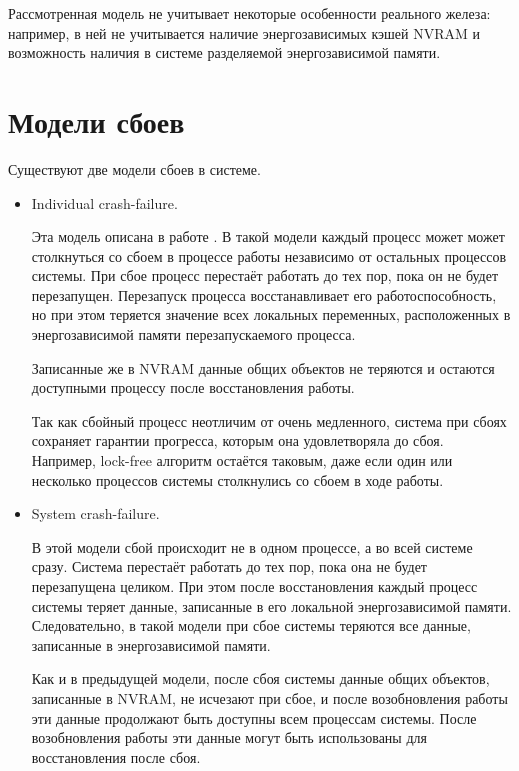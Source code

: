 \documentclass[times,specification,annotation]{itmo-student-thesis}
\begin{document}
\bigbreak

Рассмотренная модель не учитывает некоторые особенности реального железа: например, в ней не учитывается наличие энергозависимых кэшей NVRAM и возможность наличия в системе разделяемой энергозависимой памяти.

\section{Модели сбоев}
\label{crush-models}

Существуют две модели сбоев в системе.

\begin{itemize}
    \item Individual crash-failure.
    
    Эта модель описана в работе \cite{attiya2018nesting}. В такой модели каждый процесс может может столкнуться со сбоем в процессе работы независимо от остальных процессов системы. При сбое процесс перестаёт работать до тех пор, пока он не будет перезапущен. Перезапуск процесса восстанавливает его работоспособность, но при этом теряется значение всех локальных переменных, расположенных в энергозависимой памяти перезапускаемого процесса.
    
    Записанные же в NVRAM данные общих объектов не теряются и остаются доступными процессу после восстановления работы.

    Так как сбойный процесс неотличим от очень медленного, система при сбоях сохраняет гарантии прогресса, которым она удовлетворяла до сбоя. Например, lock-free алгоритм остаётся таковым, даже если один или несколько процессов системы столкнулись со сбоем в ходе работы.
    
    \item System crash-failure. 
    
    В этой модели сбой происходит не в одном процессе, а во всей системе сразу. Система перестаёт работать до тех пор, пока она не будет перезапущена целиком. При этом после восстановления каждый процесс системы теряет данные, записанные в его локальной энергозависимой памяти. Следовательно, в такой модели при сбое системы теряются все данные, записанные в энергозависимой памяти.
    
    Как и в предыдущей модели, после сбоя системы данные общих объектов, записанные в NVRAM, не исчезают при сбое, и после возобновления работы эти данные продолжают быть доступны всем процессам системы. После возобновления работы эти данные могут быть использованы для восстановления после сбоя. 
\end{itemize}
\end{document}
